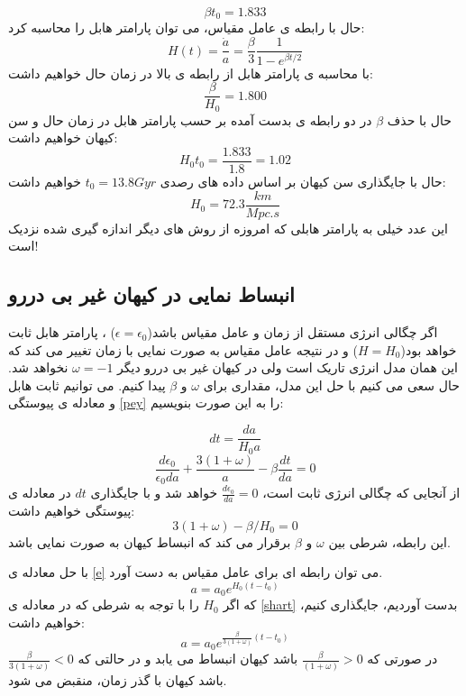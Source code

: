 \documentclass[12pt]{article}
\begin{document}
\begin{equation}
\beta t_0=1.833
\end{equation}
حال با رابطه ی عامل مقیاس، می توان پارامتر هابل را محاسبه کرد:
\begin{equation}
H(t)=\frac{\dot a}{a}=\frac{\beta}{3}\frac{1}{1-e^{\beta t/2}}
\end{equation}
با محاسبه ی پارامتر هابل از رابطه ی بالا در زمان حال خواهیم داشت:
\begin{equation}
\frac{\beta}{H_0}=1.800
\end{equation}
حال با حذف $\beta$ در دو رابطه ی بدست آمده بر حسب پارامتر هابل در زمان حال و سن کیهان خواهیم داشت:
$$H_0t_0=\frac{1.833}{1.8}=1.02$$
حال با جایگذاری سن کیهان بر اساس داده های رصدی $t_0=13.8 Gyr$ خواهیم داشت:
\begin{equation}
H_0=72.3\frac{km}{Mpc.s}
\end{equation}
این عدد خیلی به پارامتر هابلی که امروزه از روش های دیگر اندازه گیری شده نزدیک است!

\subsection{انبساط نمایی در کیهان غیر بی دررو}
اگر چگالی انرژی مستقل از زمان و عامل مقیاس باشد($\epsilon=\epsilon_0$) ، پارامتر هابل ثابت خواهد بود($H=H_0$) و در نتیجه عامل مقیاس به صورت نمایی با زمان تغییر می کند که این همان مدل انرژی تاریک است ولی در کیهان 
غیر بی دررو دیگر $\omega=-1$ نخواهد شد. حال سعی می کنیم با حل این مدل، مقداری برای $\omega$ و $\beta$ پیدا کنیم.
می توانیم ثابت هابل 
و معادله ی پیوستگی 
\eqref{pey}
را به این صورت بنویسیم:

\begin{equation}\label{e}
dt=\frac{da}{H_0a}
\end{equation}
\begin{equation}
\frac{d\epsilon_0}{\epsilon_0 da}+\frac{3(1+\omega)}{a}-\beta \frac{dt}{da}=0
\end{equation}
از آنجایی که چگالی انرژی ثابت است، $\frac{d\epsilon_0}{da}=0$ خواهد شد و با جایگذاری $dt$ در معادله ی پیوستگی خواهیم داشت:
\begin{equation}\label{shart}
3(1+\omega)-\beta/H_0=0
\end{equation}
این رابطه، شرطی بین $\omega$ و $\beta$ برقرار می کند که انبساط کیهان به صورت نمایی باشد. 

با حل معادله ی 
\eqref{e}
می توان رابطه ای برای عامل مقیاس به دست آورد.
\begin{equation}
a=a_0e^{H_0(t-t_0)}
\end{equation}
که اگر $ H_0 $ را با توجه به شرطی که در معادله ی 
\eqref{shart}
بدست آوردیم، جایگذاری کنیم، خواهیم داشت:
\begin{equation}
a=a_0e^{\frac{\beta}{3(1+\omega)}(t-t_0)}
\end{equation}
در صورتی که $\frac{\beta}{(1+\omega)}>0$ باشد کیهان انبساط می یابد و در حالتی که $\frac{\beta}{3(1+\omega)}<0$ باشد کیهان با گذر زمان، منقبض می شود.
\end{document}
